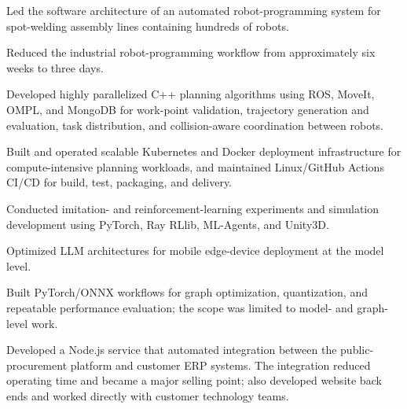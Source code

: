 \documentclass[10pt,a4paper]{article}
\begin{document}
\begin{cvbullets}
  \item Led the software architecture of an automated robot-programming system for spot-welding assembly lines containing hundreds of robots.
  \item Reduced the industrial robot-programming workflow from approximately six weeks to three days.
  \item Developed highly parallelized C++ planning algorithms using ROS, MoveIt, OMPL, and MongoDB for work-point validation, trajectory generation and evaluation, task distribution, and collision-aware coordination between robots.
  \item Built and operated scalable Kubernetes and Docker deployment infrastructure for compute-intensive planning workloads, and maintained Linux/GitHub Actions CI/CD for build, test, packaging, and delivery.
  \item Conducted imitation- and reinforcement-learning experiments and simulation development using PyTorch, Ray RLlib, ML-Agents, and Unity3D.
  \item Optimized LLM architectures for mobile edge-device deployment at the model level.
  \item Built PyTorch/ONNX workflows for graph optimization, quantization, and repeatable performance evaluation; the scope was limited to model- and graph-level work.
\end{cvbullets}

\begin{cvbullets}
  \item Developed a Node.js service that automated integration between the public-procurement platform and customer ERP systems. The integration reduced operating time and became a major selling point; also developed website back ends and worked directly with customer technology teams.
\end{cvbullets}

\end{document}
